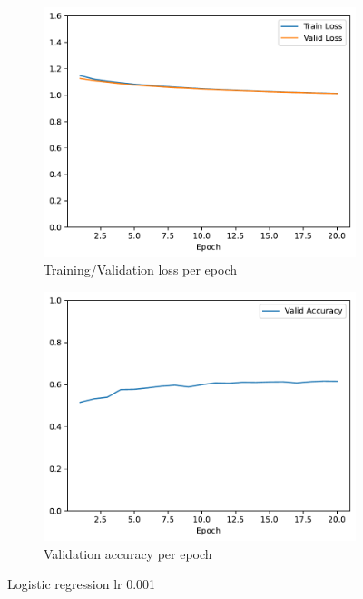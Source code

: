 \documentclass[11pt]{article}
\begin{document}
\begin{figure}[h!]
\centering
\begin{subfigure}{.5\textwidth}
  \centering
  \includegraphics[width=.9\linewidth]{plots/logistic_regression-training-loss-batch-16-lr-0.001-epochs-20-l2-0-opt-sgd}
  \caption{Training/Validation loss per epoch}
\end{subfigure}%
\begin{subfigure}{.5\textwidth}
  \centering
  \includegraphics[width=.9\linewidth]{plots/logistic_regression-validation-accuracy-batch-16-lr-0.001-epochs-20-l2-0-opt-sgd}
  \caption{Validation accuracy per epoch}
\end{subfigure}
\caption{Logistic regression lr 0.001}
\label{fig:regression_lr_0.001}
\end{figure}
\end{document}
